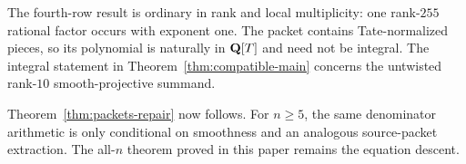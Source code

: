 \begin{remark}
The fourth-row result is ordinary in rank and local multiplicity:
one rank-\(255\) rational factor occurs with exponent one.  The packet
contains Tate-normalized pieces, so its polynomial is naturally in
\(\mathbf Q[T]\) and need not be integral.  The integral statement in
Theorem~\ref{thm:compatible-main} concerns the untwisted rank-\(10\)
smooth-projective summand.
\end{remark}

Theorem~\ref{thm:packets-repair} now follows.  For \(n\ge5\), the same
denominator arithmetic is only conditional on smoothness and an analogous
source-packet extraction.  The all-\(n\) theorem proved in this paper
remains the equation descent.
